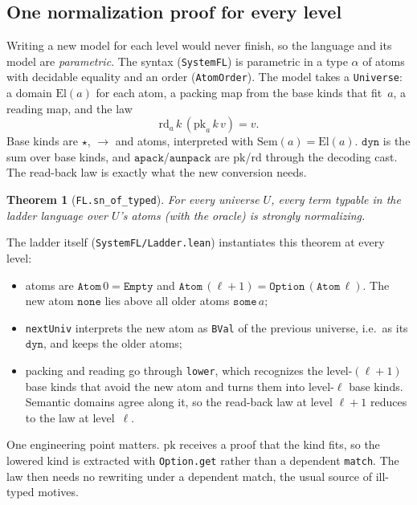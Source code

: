 \documentclass[11pt]{article}
\newtheorem{theorem}{Theorem}
\theoremstyle{definition}
\theoremstyle{remark}
\newcommand{\lean}[1]{\texttt{#1}}
\begin{document}
\subsection{One normalization proof for every level}
Writing a new model for each level would never finish, so the language and
its model are \emph{parametric}. The syntax (\lean{SystemFL}) is parametric in
a type $\alpha$ of atoms with decidable equality and an order
(\lean{AtomOrder}). The model takes a \lean{Universe}: a domain
$\mathrm{El}(a)$ for each atom, a packing map from the base kinds that fit~$a$,
a reading map, and the law
\[\mathrm{rd}_a\,k\,(\mathrm{pk}_a\,k\,v) = v .\]
Base kinds are $\star$, $\to$ and atoms, interpreted with
$\mathrm{Sem}(a)=\mathrm{El}(a)$. $\mathtt{dyn}$ is the sum over base kinds,
and $\mathtt{apack}$/$\mathtt{aunpack}$ are $\mathrm{pk}$/$\mathrm{rd}$ through
the decoding cast. The read-back law is exactly what the new conversion needs.
\begin{theorem}[\lean{FL.sn\_of\_typed}]
For every universe $U$, every term typable in the ladder language over $U$'s
atoms (with the oracle) is strongly normalizing.
\end{theorem}
The ladder itself (\lean{SystemFL/Ladder.lean}) instantiates this theorem at
every level:
\begin{itemize}
\item atoms are $\mathtt{Atom}\,0=\mathtt{Empty}$ and
  $\mathtt{Atom}\,(\ell+1)=\mathtt{Option}\,(\mathtt{Atom}\,\ell)$. The new
  atom $\mathtt{none}$ lies above all older atoms $\mathtt{some}\,a$;
\item \lean{nextUniv} interprets the new atom as \lean{BVal} of the previous
  universe, i.e.\ as its $\mathtt{dyn}$, and keeps the older atoms;
\item packing and reading go through \lean{lower}, which recognizes the
  level-$(\ell+1)$ base kinds that avoid the new atom and turns them into
  level-$\ell$ base kinds. Semantic domains agree along it, so the read-back
  law at level $\ell+1$ reduces to the law at level~$\ell$.
\end{itemize}
One engineering point matters. $\mathrm{pk}$ receives a proof that the kind
fits, so the lowered kind is extracted with \lean{Option.get} rather than a
dependent \lean{match}. The law then needs no rewriting under a dependent
match, the usual source of ill-typed motives.
\end{document}
